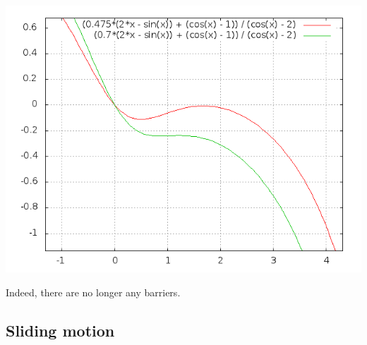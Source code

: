 \documentclass{article}
\begin{document}
\includegraphics[width=\textwidth]{4A2.png}

Indeed, there are no longer any barriers.

\subsection{Sliding motion}
\end{document}
